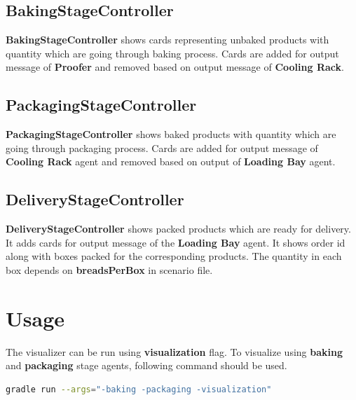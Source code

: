 \documentclass[12pt]{article}
\begin{document}
\subsection{BakingStageController}
\textbf{BakingStageController} shows cards representing unbaked products with quantity which are going through baking process. Cards are added for output message of \textbf{Proofer} and removed based on output message of \textbf{Cooling Rack}.

\subsection{PackagingStageController}
\textbf{PackagingStageController} shows baked products with quantity which are going through packaging process. Cards are added for output message of \textbf{Cooling Rack} agent and removed based on output of \textbf{Loading Bay} agent.

\subsection{DeliveryStageController}
\textbf{DeliveryStageController} shows packed products which are ready for delivery. It adds cards for output message of the \textbf{Loading Bay} agent. It shows order id along with boxes packed for the corresponding products. The quantity in each box depends on \textbf{breadsPerBox} in scenario file.

\section{Usage}

The visualizer can be run using \textbf{visualization} flag. To visualize using \textbf{baking} and \textbf{packaging} stage agents, following command should be used.

\begin{lstlisting}[language=bash]
gradle run --args="-baking -packaging -visualization"
\end{lstlisting}
\end{document}
